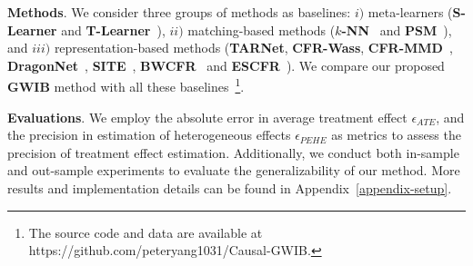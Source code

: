 \documentclass{article}
\begin{document}
\vspace{0.2cm}
\noindent
\textbf{Methods}.
We consider three groups of methods as baselines: 
$i)$ meta-learners (\textbf{S-Learner} and \textbf{T-Learner}~\cite{kunzel2019metalearners}),
$ii)$ matching-based methods (\textbf{$k$-NN}~\cite{crump2008nonparametric} and \textbf{PSM}~\cite{caliendo2008some}),
and $iii)$ representation-based methods (\textbf{TARNet}, \textbf{CFR-Wass}, \textbf{CFR-MMD}~\cite{shalit2017estimating}, \textbf{DragonNet}~\cite{shi2019adapting}, \textbf{SITE}~\cite{yao2018representation}, \textbf{BWCFR}~\cite{assaad2021counterfactual} and \textbf{ESCFR}~\cite{wang2023optimal}).
We compare our proposed \textbf{GWIB} method with all these baselines~\footnote{The source code and data are available at https://github.com/peteryang1031/Causal-GWIB.}.

\vspace{0.2cm}
\noindent
\textbf{Evaluations}. 
We employ the absolute error in average treatment effect $\epsilon_{ATE}$, and the precision in estimation of heterogeneous effects $\epsilon_{PEHE}$ as metrics to assess the precision of treatment effect estimation.
Additionally, we conduct both in-sample and out-sample experiments to evaluate the generalizability of our method. 
More results and implementation details can be found in Appendix~\ref{appendix-setup}.
\end{document}
